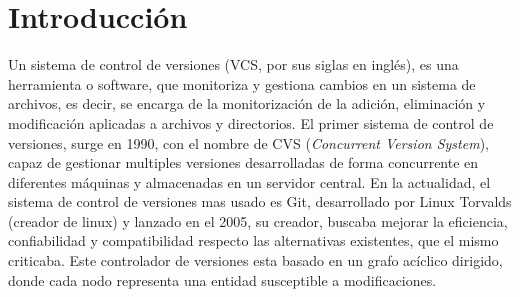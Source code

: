 \chapter{Introducción\label{01intro}}






Un sistema de control de versiones (VCS, por sus siglas en inglés), es una
herramienta o software, que monitoriza y gestiona cambios en un sistema de
archivos, es decir, se encarga de la monitorización de la adición,
eliminación y modificación aplicadas a archivos y directorios. El primer
sistema de control de versiones, surge en 1990, con el nombre de CVS
({\em Concurrent Version System}), capaz de gestionar multiples versiones
desarrolladas de forma concurrente en diferentes máquinas y almacenadas en
un servidor central. En la actualidad, el sistema de control de versiones
mas usado es Git, desarrollado por Linux Torvalds (creador de linux) y
lanzado en el 2005, su creador, buscaba mejorar la eficiencia,
confiabilidad y compatibilidad respecto las alternativas existentes, que el
mismo criticaba. Este controlador de versiones esta basado en un grafo
acíclico dirigido, donde cada nodo representa una entidad susceptible a
modificaciones.

